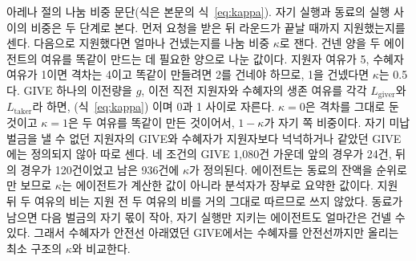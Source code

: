 아레나 절의 나눔 비중 문단(식은 본문의 식~\ref{eq:kappa}).
자기 실행과 동료의 실행 사이의 비중은 두 단계로 본다. 먼저 요청을 받은 뒤 라운드가 끝날 때까지 지원했는지를 센다. 다음으로 지원했다면 얼마나 건넸는지를 나눔 비중 $\kappa$로 잰다. 건넨 양을 두 에이전트의 여유를 똑같이 만드는 데 필요한 양으로 나눈 값이다. 지원자 여유가 5, 수혜자 여유가 1이면 격차는 4이고 똑같이 만들려면 2를 건네야 하므로, 1을 건넸다면 $\kappa$는 0.5다. GIVE 하나의 이전량을 $g$, 이전 직전 지원자와 수혜자의 생존 여유를 각각 $L_{\mathrm{giver}}$와 $L_{\mathrm{taker}}$라 하면, (식~\ref{eq:kappa}) 이며 0과 1 사이로 자른다. $\kappa=0$은 격차를 그대로 둔 것이고 $\kappa=1$은 두 여유를 똑같이 만든 것이어서, $1-\kappa$가 자기 쪽 비중이다. 자기 미납 벌금을 낼 수 없던 지원자의 GIVE와 수혜자가 지원자보다 넉넉하거나 같았던 GIVE에는 정의되지 않아 따로 센다. 네 조건의 GIVE 1,080건 가운데 앞의 경우가 24건, 뒤의 경우가 120건이었고 남은 936건에 $\kappa$가 정의된다. 에이전트는 동료의 잔액을 순위로만 보므로 $\kappa$는 에이전트가 계산한 값이 아니라 분석자가 장부로 요약한 값이다. 지원 뒤 두 여유의 비는 지원 전 두 여유의 비를 거의 그대로 따르므로 쓰지 않았다. 동료가 남으면 다음 벌금의 자기 몫이 작아, 자기 실행만 지키는 에이전트도 얼마간은 건넬 수 있다. 그래서 수혜자가 안전선 아래였던 GIVE에서는 수혜자를 안전선까지만 올리는 최소 구조의 $\kappa$와 비교한다.

